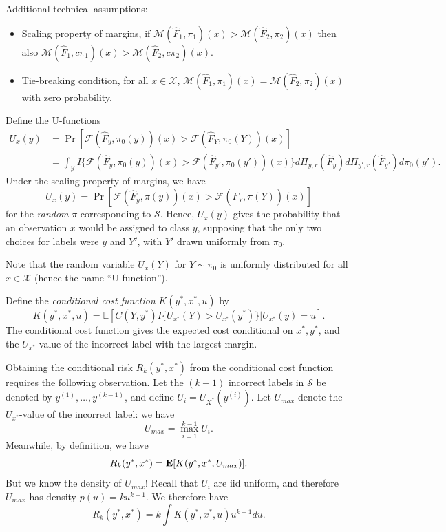 \documentclass[12pt]{article}
\begin{document}
Additional technical assumptions:
\begin{itemize}
\item 
Scaling property of margins, if $\mathcal{M}(\hat{F}_1, \pi_1)(x) >
\mathcal{M}(\hat{F}_2, \pi_2)(x)$ then also $\mathcal{M}(\hat{F}_1,
c\pi_1)(x) > \mathcal{M}(\hat{F}_2, c\pi_2)(x)$.
\item 
Tie-breaking condition, for all $x \in \mathcal{X}$,
$\mathcal{M}(\hat{F}_1, \pi_1)(x) = \mathcal{M}(\hat{F}_2, \pi_2)(x)$
with zero probability.
\end{itemize}

Define the U-functions
\begin{align}\label{eq:ufunc}
U_x(y) &= \Pr[\mathcal{F}(\hat{F}_y, \pi_0(y))(x) > \mathcal{F}(\hat{F}_Y, \pi_0(Y))(x)]
\\&= \int_{\mathcal{Y}} 
I\{
\mathcal{F}(\hat{F}_y, \pi_0(y))(x) > \mathcal{F}(\hat{F}_{y'}, \pi_0(y'))(x)
\}
d\Pi_{y, r}(\hat{F}_y)
d\Pi_{y', r}(\hat{F}_{y'})
d\pi_0(y').
\end{align}
Under the scaling property of margins, we have
\[
U_x(y) =  \Pr[\mathcal{F}(\hat{F}_y, \pi(y))(x) > \mathcal{F}(\hat{F}_Y, \pi(Y))(x)]
\]
for the \emph{random} $\pi$ corresponding to $\mathcal{S}$.  Hence,
$U_x(y)$ gives the probability that an observation $x$ would be
assigned to class $y$, supposing that the only two choices for labels
were $y$ and $Y'$, with $Y'$ drawn uniformly from $\pi_0$.

Note that the random variable $U_x(Y)$ for $Y \sim \pi_0$ is uniformly
distributed for all $x \in \mathcal{X}$ (hence the name ``U-function'').

Define the \emph{conditional cost function} $K(y^*, x^*, u)$ by
\begin{equation}\label{eq:Kfunc}
K(y^*, x^*, u) = \mathbb{E}[C(Y, y^*)I\{U_{x^*}(Y) > U_{x^*}(y^*)\}|U_{x^*}(y) = u].
\end{equation}
The conditional cost function gives the expected cost conditional on
$x^*, y^*$, and the $U_{x^*}$-value of the incorrect label with the
largest margin.

Obtaining the conditional risk $R_k(y^*, x^*)$ from the conditional
cost function requires the following observation.  Let the $(k-1)$
incorrect labels in $\mathcal{S}$ be denoted by $y^{(1)},\hdots,
y^{(k-1)}$, and define $U_i = U_{X^*}(y^{(i)})$. Let $U_{max}$ denote the $U_{x^*}$-value of
the incorrect label: we have
\[
U_{max} = \max_{i=1}^{k-1} U_i.
\]
Meanwhile, by definition, we have
\[
R_k(y^*, x^*) = \textbf{E}[K(y^*, x^*, U_{max})].
\]
But we know the density of $U_{max}$!  Recall that $U_i$ are iid
uniform, and therefore $U_{max}$ has density $p(u) = ku^{k-1}$.  We
therefore have
\[
R_k(y^*, x^*) = k \int K(y^*, x^*, u) u^{k-1} du.
\]
\end{document}
